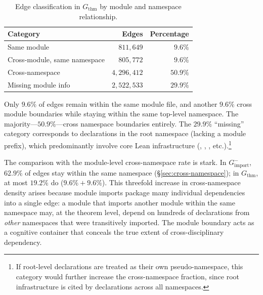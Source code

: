 \begin{table}[ht]
\centering
\caption{Edge classification in $G_{\mathrm{thm}}$ by module and namespace relationship.}
\label{tab:thm-edge-breakdown}
\begin{tabular}{lrr}
\toprule
Category & Edges & Percentage \\
\midrule
Same module                    & $811{,}649$   & $9.6\%$ \\
Cross-module, same namespace   & $805{,}772$   & $9.6\%$ \\
Cross-namespace                & $4{,}296{,}412$ & $50.9\%$ \\
Missing module info            & $2{,}522{,}533$ & $29.9\%$ \\
\bottomrule
\end{tabular}
\end{table}

Only $9.6\%$ of edges remain within the same module file, and another $9.6\%$ cross module boundaries while staying within the same top-level namespace. The majority---$50.9\%$---cross namespace boundaries entirely. The $29.9\%$ ``missing'' category corresponds to declarations in the root namespace (lacking a module prefix), which predominantly involve core Lean infrastructure (, , , etc.).\footnote{If root-level declarations are treated as their own pseudo-namespace, this category would further increase the cross-namespace fraction, since root infrastructure is cited by declarations across all namespaces.}

The comparison with the module-level cross-namespace rate is stark. In $G_{\mathrm{import}}^{-}$, $62.9\%$ of edges stay within the same namespace (\S\ref{sec:cross-namespace}); in $G_{\mathrm{thm}}$, at most $19.2\%$ do ($9.6\% + 9.6\%$). This threefold increase in cross-namespace density arises because module imports package many individual dependencies into a single edge: a module that imports another module within the same namespace may, at the theorem level, depend on hundreds of declarations from \emph{other} namespaces that were transitively imported. The module boundary acts as a cognitive container that conceals the true extent of cross-disciplinary dependency.


